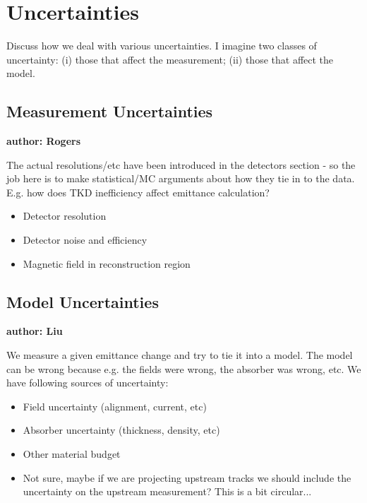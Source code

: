 \section{Uncertainties}

Discuss how we deal with various uncertainties. I imagine two classes of
uncertainty: (i) those that affect the measurement; (ii) those that affect the
model.

\subsection{Measurement Uncertainties}

\textbf{author: Rogers}

The actual resolutions/etc have been introduced in the detectors section - so 
the job here is to make statistical/MC arguments about how they tie in to the 
data. E.g. how does TKD inefficiency affect emittance calculation?

\begin{itemize}
\item Detector resolution
\item Detector noise and efficiency
\item Magnetic field in reconstruction region
\end{itemize}

\subsection{Model Uncertainties}

\textbf{author: Liu}

We measure a given emittance change and try to tie it into a model. The model
can be wrong because e.g. the fields were wrong, the absorber was wrong, etc. We
have following sources of uncertainty:

\begin{itemize}
\item Field uncertainty (alignment, current, etc)
\item Absorber uncertainty (thickness, density, etc)
\item Other material budget
\item Not sure, maybe if we are projecting upstream tracks we should include the
uncertainty on the upstream measurement? This is a bit circular...
\end{itemize}


